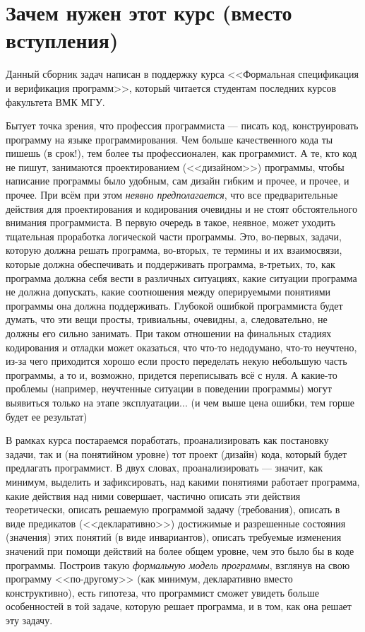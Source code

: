 \pagebreak
\section*{Зачем нужен этот курс (вместо вступления)}

Данный сборник задач написан в поддержку курса <<Формальная спецификация и верификация программ>>, который читается студентам последних курсов факультета ВМК МГУ.

Бытует точка зрения, что профессия программиста --- писать код, конструировать программу на языке программирования. Чем больше качественного кода ты пишешь (в срок!), тем более ты профессионален, как программист. А те, кто код не пишут, занимаются проектированием (<<дизайном>>) программы, чтобы написание программы было удобным, сам дизайн гибким и прочее, и прочее, и прочее. При всём при этом \emph{неявно предполагается}, что все предварительные действия для проектирования и кодирования очевидны и не стоят обстоятельного внимания программиста. В первую очередь в такое, неявное, может уходить тщательная проработка логической части программы. Это, во-первых, задачи, которую должна решать программа, во-вторых, те термины и их взаимосвязи, которые должна обеспечивать и поддерживать программа, в-третьих, то, как программа должна себя вести в различных ситуациях, какие ситуации программа не должна допускать, какие соотношения между оперируемыми понятиями программы она должна поддерживать. Глубокой ошибкой программиста будет думать, что эти вещи просты, тривиальны, очевидны, а, следовательно, не должны его сильно занимать. При таком отношении на финальных стадиях кодирования и отладки может оказаться, что что-то недодумано, что-то неучтено, из-за чего приходится хорошо если просто переделать некую небольшую часть программы, а то и, возможно, придется переписывать всё с нуля. А какие-то проблемы (например, неучтенные ситуации в поведении программы) могут выявиться только на этапе эксплуатации... (и чем выше цена ошибки, тем горше будет ее результат)

В рамках курса постараемся поработать, проанализировать как постановку задачи, так и (на понятийном уровне) тот проект (дизайн) кода, который будет предлагать программист. В двух словах, проанализировать --- значит, как минимум, выделить и зафиксировать, над какими понятиями работает программа, какие действия над ними совершает, частично описать эти действия теоретически, описать решаемую программой задачу (требования), описать в виде предикатов (<<декларативно>>) достижимые и разрешенные состояния (значения) этих понятий (в виде инвариантов), описать требуемые изменения значений при помощи действий на более общем уровне, чем это было бы в коде программы. Построив такую \emph{формальную модель программы}, взглянув на свою программу <<по-другому>> (как минимум, декларативно вместо конструктивно), есть гипотеза, что программист сможет увидеть больше особенностей в той задаче, которую решает программа, и в том, как она решает эту задачу.

